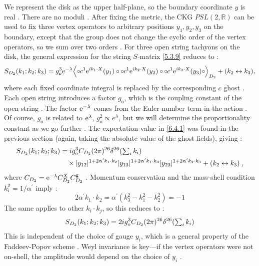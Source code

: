 We represent the disk as the upper half-plane, so the boundary coordinate $y$ is real . There are no moduli . After fixing the metric, the CKG $PSL(2, \mathds{R})$ can be used to fix three vertex operators to arbitrary positions $y_{1}, y_{2}, y_{3}$ on the boundary, except that the group does not change the cyclic order of the vertex operators, so we sum over two orders . For three open string tachyons on the disk, the general expression for the string $S$-matrix \eqref{5.3.9} reduces to :
\begin{align}
	S_{D_{2}}(k_{1} ; k_{2} ; k_{3})=g_{\mathrm{o}}^{3} \mathrm{e}^{-\lambda}
	\Bigl\langle \circ\mkern-1mu c^1 \mathrm{e}^{i k_{1} \cdot X}(y_{1})\circ\mkern-1mu \circ\mkern-1mu c^{1} \mathrm{e}^{i k_{2} \cdot X}(y_{2})\circ\mkern-1mu 
	\circ\mkern-1mu c^{1} \mathrm{e}^{i k_{3} \cdot X}(y_{3})\circ\mkern-1mu\Bigr\rangle_{D_{2}} 
	+(k_{2} \leftrightarrow k_{3}),  \label{6.4.1}
\end{align}
where each fixed coordinate integral is replaced by the corresponding $c$ ghost . Each open string introduces a factor $g_{\mathrm{o}}$, which is the coupling constant of the open string . The factor $\mathrm{e}^{-\lambda}$ comes from the Euler number term in the action . Of course, $g_{\mathrm{o}}$ is related to $\mathrm{e}^{\lambda}$, $g_{\mathrm{o}}^{2} \propto e^{\lambda}$, but we will determine the proportionality constant as we go further . The expectation value in \eqref{6.4.1} was found in the previous section (again, taking the absolute value of the ghost fields), giving :
\begin{align}
	S_{D_{2}}(k_{1} ; k_{2} ; k_{3})&= i g_{\mathrm{o}}^{3} C_{D_{2}}(2 \pi)^{26} \delta^{26}({\textstyle \sum_{i} k_{i}}) \nonumber  \\
	&\quad \times |y_{12}|^{1+2 \alpha^{\prime} k_{1} \cdot k_{2}}|y_{13}|^{1+2 \alpha^{\prime} k_{1} \cdot k_{3}}
	|y_{23}|^{1+2 \alpha^{\prime} k_{2} \cdot k_{3}}+ (k_{2} \leftrightarrow k_{3}) \:, \label{6.4.2}
\end{align}
where $C_{D_{2}}=\mathrm{e}^{-\lambda} C_{D_{2}}^{X} C_{D_{2}}^{\mathrm{g}}$ . Momentum conservation and the mass-shell condition $k_{i}^{2}=1 / \alpha^{\prime}$ imply :
\begin{equation}
	2 \alpha^{\prime} k_{1} \cdot k_{2}=\alpha^{\prime}(k_{3}^{2}-k_{1}^{2}-k_{2}^{2})=-1 \label{6.4.3}
\end{equation}
The same applies to other $k_{i} \cdot k_{j}$, so this reduces to :
\begin{equation}
	S_{D_{2}}(k_{1} ; k_{2} ; k_{3})=2 i g_{\mathrm{o}}^{3} C_{D_{2}}(2 \pi)^{26} \delta^{26}({\textstyle\sum_{i} k_{i}}) \label{6.4.4}
\end{equation}
This is independent of the choice of gauge $y_{i}$, which is a general property of the Faddeev-Popov scheme . Weyl invariance is key—if the vertex operators were not on-shell, the amplitude would depend on the choice of $y_{i}$ .


